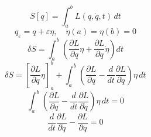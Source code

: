 \documentclass{article}
\begin{document}
\[
S[q]=\int_a^b L(q,\dot q,t)\,dt
\]
\[
q_{\varepsilon}=q+\varepsilon\eta,\quad\eta(a)=\eta(b)=0
\]
\[
\delta S=\int_a^b\left(\frac{\partial L}{\partial q}\eta+\frac{\partial L}{\partial\dot q}\dot\eta\right)dt
\]
\[
\delta S=\left[\frac{\partial L}{\partial\dot q}\eta\right]_a^b+\int_a^b\left(\frac{\partial L}{\partial q}-\frac{d}{dt}\frac{\partial L}{\partial\dot q}\right)\eta\,dt
\]
\[
\int_a^b\left(\frac{\partial L}{\partial q}-\frac{d}{dt}\frac{\partial L}{\partial\dot q}\right)\eta\,dt=0
\]
\[
\frac{d}{dt}\frac{\partial L}{\partial\dot q}-\frac{\partial L}{\partial q}=0
\]
\end{document}
